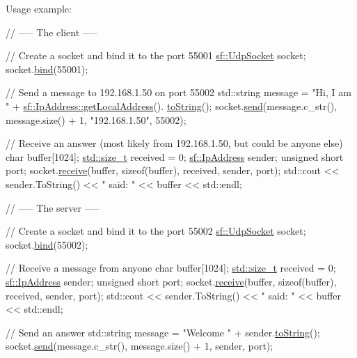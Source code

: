 Usage example\-: 
\begin{DoxyCode}
\textcolor{comment}{// ----- The client -----}

\textcolor{comment}{// Create a socket and bind it to the port 55001}
\hyperlink{classsf_1_1_udp_socket}{sf::UdpSocket} socket;
socket.\hyperlink{classsf_1_1_udp_socket_ab0bf8d32849836f92beb2fd734565481}{bind}(55001);

\textcolor{comment}{// Send a message to 192.168.1.50 on port 55002}
std::string message = \textcolor{stringliteral}{"Hi, I am "} + \hyperlink{classsf_1_1_ip_address_a4c31622ad87edca48adbb8e8ed00ee4a}{sf::IpAddress::getLocalAddress}().
      \hyperlink{classsf_1_1_ip_address_a52f4be92fb0ceb689abc469e4a85fd82}{toString}();
socket.\hyperlink{classsf_1_1_udp_socket_a664ab8f26f37c21cc4de1b847c2efcca}{send}(message.c\_str(), message.size() + 1, \textcolor{stringliteral}{"192.168.1.50"}, 55002);

\textcolor{comment}{// Receive an answer (most likely from 192.168.1.50, but could be anyone else)}
\textcolor{keywordtype}{char} buffer[1024];
\hyperlink{curses_8priv_8h_ae43e1afb4123c6ddee091cf03ec10266}{std::size\_t} received = 0;
\hyperlink{classsf_1_1_ip_address}{sf::IpAddress} sender;
\textcolor{keywordtype}{unsigned} \textcolor{keywordtype}{short} port;
socket.\hyperlink{classsf_1_1_udp_socket_ade9ca0f7ed7919136917b0b997a9833a}{receive}(buffer, \textcolor{keyword}{sizeof}(buffer), received, sender, port);
std::cout << sender.ToString() << \textcolor{stringliteral}{" said: "} << buffer << std::endl;

\textcolor{comment}{// ----- The server -----}

\textcolor{comment}{// Create a socket and bind it to the port 55002}
\hyperlink{classsf_1_1_udp_socket}{sf::UdpSocket} socket;
socket.\hyperlink{classsf_1_1_udp_socket_ab0bf8d32849836f92beb2fd734565481}{bind}(55002);

\textcolor{comment}{// Receive a message from anyone}
\textcolor{keywordtype}{char} buffer[1024];
\hyperlink{curses_8priv_8h_ae43e1afb4123c6ddee091cf03ec10266}{std::size\_t} received = 0;
\hyperlink{classsf_1_1_ip_address}{sf::IpAddress} sender;
\textcolor{keywordtype}{unsigned} \textcolor{keywordtype}{short} port;
socket.\hyperlink{classsf_1_1_udp_socket_ade9ca0f7ed7919136917b0b997a9833a}{receive}(buffer, \textcolor{keyword}{sizeof}(buffer), received, sender, port);
std::cout << sender.ToString() << \textcolor{stringliteral}{" said: "} << buffer << std::endl;

\textcolor{comment}{// Send an answer}
std::string message = \textcolor{stringliteral}{"Welcome "} + sender.\hyperlink{classsf_1_1_ip_address_a52f4be92fb0ceb689abc469e4a85fd82}{toString}();
socket.\hyperlink{classsf_1_1_udp_socket_a664ab8f26f37c21cc4de1b847c2efcca}{send}(message.c\_str(), message.size() + 1, sender, port);
\end{DoxyCode}


